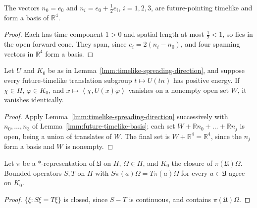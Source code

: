 \begin{lemma}
    \label{lmm:future-timelike-basis}
    \leanok
    The vectors $n_0 = e_0$ and $n_i = e_0 + \tfrac{1}{2}e_i$, $i = 1, 2, 3$, are future-pointing timelike and form a basis of $\mathbb{R}^4$.
\end{lemma}
\begin{proof}
    \leanok
    Each has time component $1 > 0$ and spatial length at most $\tfrac{1}{2} < 1$, so lies in the open forward cone. They span, since $e_i = 2(n_i - n_0)$, and four spanning vectors in $\mathbb{R}^4$ form a basis.
\end{proof}

\begin{lemma}
    \label{lmm:timelike-spreading}
    \leanok
    Let $U$ and $K_0$ be as in Lemma~\ref{lmm:timelike-spreading-direction}, and suppose every future-timelike translation subgroup $t \mapsto U(tn)$ has positive energy. If $\chi \in H$, $\varphi \in K_0$, and $x \mapsto \left< \chi, U(x)\varphi \right>$ vanishes on a nonempty open set $W$, it vanishes identically.
\end{lemma}
\begin{proof}
    \leanok
    Apply Lemma~\ref{lmm:timelike-spreading-direction} successively with $n_0, \dots, n_3$ of Lemma~\ref{lmm:future-timelike-basis}; each set $W + \mathbb{R}n_0 + \dots + \mathbb{R}n_j$ is open, being a union of translates of $W$. The final set is $W + \mathbb{R}^4 = \mathbb{R}^4$, since the $n_j$ form a basis and $W$ is nonempty.
\end{proof}

\begin{lemma}
    \label{lmm:agree-on-cyclic-subspace}
    \leanok
    Let $\pi$ be a $*$-representation of $\mathfrak{U}$ on $H$, $\Omega \in H$, and $K_0$ the closure of $\pi(\mathfrak{U})\Omega$. Bounded operators $S, T$ on $H$ with $S\pi(a)\Omega = T\pi(a)\Omega$ for every $a \in \mathfrak{U}$ agree on $K_0$.
\end{lemma}
\begin{proof}
    \leanok
    $\{\xi : S\xi = T\xi\}$ is closed, since $S - T$ is continuous, and contains $\pi(\mathfrak{U})\Omega$.
\end{proof}

